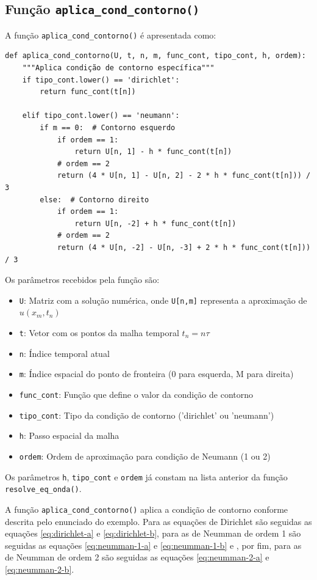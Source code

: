 \documentclass[column,amsmath,amssymb,floatfix]{revtex4}
\begin{document}
\subsection{Função \texttt{aplica\_cond\_contorno()}}
A função \texttt{aplica\_cond\_contorno()} é apresentada como:
\begin{lstlisting}
def aplica_cond_contorno(U, t, n, m, func_cont, tipo_cont, h, ordem):
    """Aplica condição de contorno específica"""
    if tipo_cont.lower() == 'dirichlet':
        return func_cont(t[n])

    elif tipo_cont.lower() == 'neumann':
        if m == 0:  # Contorno esquerdo
            if ordem == 1:
                return U[n, 1] - h * func_cont(t[n])
            # ordem == 2
            return (4 * U[n, 1] - U[n, 2] - 2 * h * func_cont(t[n])) / 3
        else:  # Contorno direito
            if ordem == 1:
                return U[n, -2] + h * func_cont(t[n])
            # ordem == 2
            return (4 * U[n, -2] - U[n, -3] + 2 * h * func_cont(t[n])) / 3
\end{lstlisting}

Os parâmetros recebidos pela função são:
\begin{itemize}
	\item \texttt{U}: Matriz com a solução numérica, onde \texttt{U[n,m]} representa a aproximação de $u(x_m,t_n)$
	\item \texttt{t}: Vetor com os pontos da malha temporal $t_n = n\tau$
	\item \texttt{n}: Índice temporal atual
	\item \texttt{m}: Índice espacial do ponto de fronteira (0 para esquerda, M para direita)
	\item \texttt{func\_cont}: Função que define o valor da condição de contorno
	\item \texttt{tipo\_cont}: Tipo da condição de contorno ('dirichlet' ou 'neumann')
	\item \texttt{h}: Passo espacial da malha
	\item \texttt{ordem}: Ordem de aproximação para condição de Neumann (1 ou 2)
\end{itemize}

Os parâmetros \texttt{h}, \texttt{tipo\_cont} e \texttt{ordem} já constam na lista anterior da função \texttt{resolve\_eq\_onda()}.

A função \texttt{aplica\_cond\_contorno()} aplica a condição de contorno conforme descrita pelo enunciado do exemplo. Para as equações de Dirichlet são seguidas as equações \eqref{eq:dirichlet-a} e \eqref{eq:dirichlet-b}, para as de Neumman de ordem 1 são seguidas as equações \eqref{eq:neumman-1-a} e \eqref{eq:neumman-1-b} e , por fim, para as de Neumman de ordem 2 são seguidas as equações \eqref{eq:neumman-2-a} e \eqref{eq:neumman-2-b}.
\end{document}
